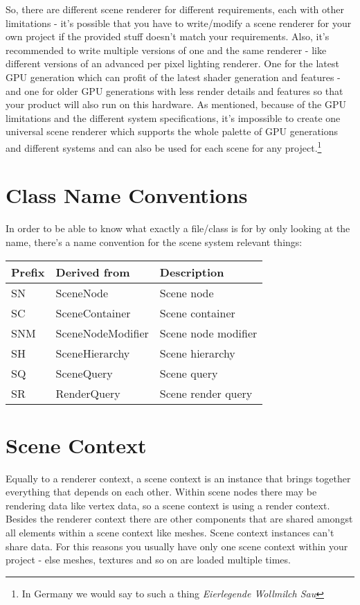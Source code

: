 So, there are different scene renderer for different requirements, each with other limitations - it's possible that you have to write/modify a scene renderer for your own project if the provided stuff doesn't match your requirements. Also, it's recommended to write multiple versions of one and the same renderer - like different versions of an advanced per pixel lighting renderer. One for the latest \ac{GPU} generation which can profit of the latest shader generation and features - and one for older \ac{GPU} generations with less render details and features so that your product will also run on this hardware. As mentioned, because of the \ac{GPU} limitations and the different system specifications, it's impossible to create one universal scene renderer which supports the whole palette of \ac{GPU} generations and different systems and can also be used for each scene for any project.\footnote{In Germany we would say to such a thing \emph{Eierlegende Wollmilch Sau}}




\section{Class Name Conventions}
In order to be able to know what exactly a file/class is for by only looking at the name, there's a name convention for the scene system relevant things:

\begin{tabular}{|p{2cm}|p{5cm}|p{7cm}|}
\hline
\textbf{Prefix} & \textbf{Derived from} & \textbf{Description}\\
\hline
SN  & SceneNode         & Scene node\\
\hline
SC  & SceneContainer    & Scene container\\
\hline
SNM & SceneNodeModifier & Scene node modifier \\
\hline
SH  & SceneHierarchy    & Scene hierarchy\\
\hline
SQ  & SceneQuery        & Scene query\\
\hline
SR  & RenderQuery       & Scene render query\\
\hline
\end{tabular}




\section{Scene Context}
Equally to a renderer context, a scene context is an instance that brings together everything that depends on each other. Within scene nodes there may be rendering data like vertex data, so a scene context is using a render context. Besides the renderer context there are other components that are shared amongst all elements within a scene context like meshes. Scene context instances can't share data. For this reasons you usually have only one scene context within your project - else meshes, textures and so on are loaded multiple times.




